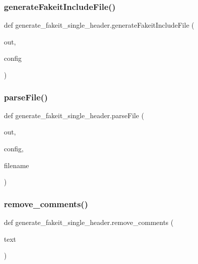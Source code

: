 \subsubsection{\texorpdfstring{generateFakeitIncludeFile()}{generateFakeitIncludeFile()}}
{\footnotesize\ttfamily def generate\+\_\+fakeit\+\_\+single\+\_\+header.\+generate\+Fakeit\+Include\+File (\begin{DoxyParamCaption}\item[{}]{out,  }\item[{}]{config }\end{DoxyParamCaption})}

\mbox{\label{namespacegenerate__fakeit__single__header_a783f58bb10a5123efa33f4c60bfc323b}} 
\subsubsection{\texorpdfstring{parseFile()}{parseFile()}}
{\footnotesize\ttfamily def generate\+\_\+fakeit\+\_\+single\+\_\+header.\+parse\+File (\begin{DoxyParamCaption}\item[{}]{out,  }\item[{}]{config,  }\item[{}]{filename }\end{DoxyParamCaption})}

\mbox{\label{namespacegenerate__fakeit__single__header_a0186da228170e7785db504ca119dc370}} 
\subsubsection{\texorpdfstring{remove\_comments()}{remove\_comments()}}
{\footnotesize\ttfamily def generate\+\_\+fakeit\+\_\+single\+\_\+header.\+remove\+\_\+comments (\begin{DoxyParamCaption}\item[{}]{text }\end{DoxyParamCaption})}

